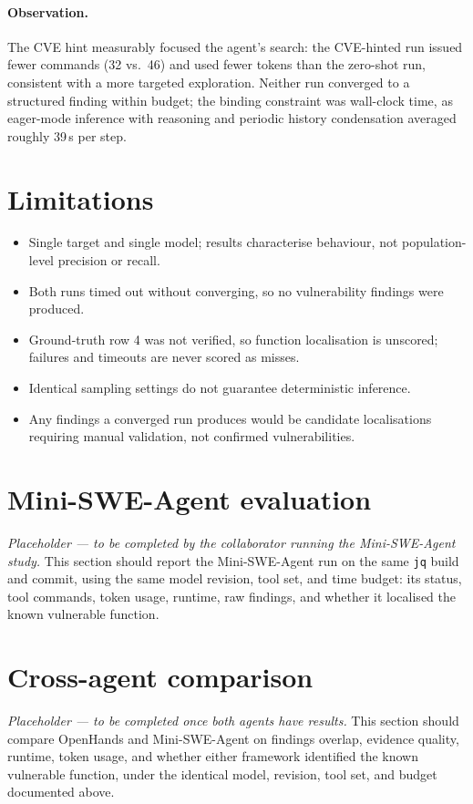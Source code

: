 \documentclass[11pt]{article}
\begin{document}
\paragraph{Observation.} The CVE hint measurably focused the agent's search: the CVE-hinted
run issued fewer commands (32 vs.\ 46) and used fewer tokens than the zero-shot run,
consistent with a more targeted exploration. Neither run converged to a structured finding
within budget; the binding constraint was wall-clock time, as eager-mode inference with
reasoning and periodic history condensation averaged roughly 39\,s per step.

\section{Limitations}
\begin{itemize}[leftmargin=1.4em,itemsep=2pt]
  \item Single target and single model; results characterise behaviour, not population-level
        precision or recall.
  \item Both runs timed out without converging, so no vulnerability findings were produced.
  \item Ground-truth row 4 was not verified, so function localisation is unscored; failures
        and timeouts are never scored as misses.
  \item Identical sampling settings do not guarantee deterministic inference.
  \item Any findings a converged run produces would be candidate localisations requiring
        manual validation, not confirmed vulnerabilities.
\end{itemize}

\section{Mini-SWE-Agent evaluation}\label{sec:minimswe}
\emph{Placeholder --- to be completed by the collaborator running the Mini-SWE-Agent study.}
This section should report the Mini-SWE-Agent run on the same \texttt{jq} build and commit,
using the same model revision, tool set, and time budget: its status, tool commands, token
usage, runtime, raw findings, and whether it localised the known vulnerable function.

\section{Cross-agent comparison}\label{sec:cross}
\emph{Placeholder --- to be completed once both agents have results.} This section should
compare OpenHands and Mini-SWE-Agent on findings overlap, evidence quality, runtime, token
usage, and whether either framework identified the known vulnerable function, under the
identical model, revision, tool set, and budget documented above.
\end{document}
